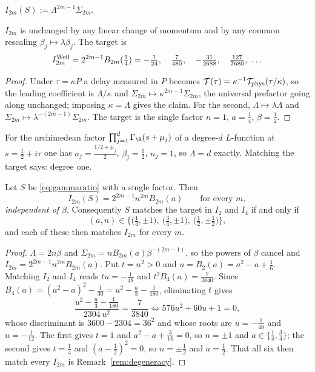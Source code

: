 \begin{definition}\label{def:invariants}
$I_{2m}(S):=\Lambda^{2m-1}\Sigma_{2m}$.
\end{definition}

\begin{proposition}\label{prop:dictfree}
$I_{2m}$ is unchanged by any linear change of momentum and by any common
rescaling $\beta_j\mapsto\lambda\beta_j$. The target is
\[
 I_{2m}^{\rm Weil}=2^{2m-1}B_{2m}(\tfrac14)
 =-\tfrac1{24},\quad\tfrac7{480},\quad-\tfrac{31}{2688},\quad\tfrac{127}{7680},\ \dots
\]
\end{proposition}

\begin{proof}
Under $\tau=\kappa P$ a delay measured in $P$ becomes
$\mathcal T(\tau)=\kappa^{-1}\mathcal T_{\rm phys}(\tau/\kappa)$, so the leading
coefficient is $\Lambda/\kappa$ and $\Sigma_{2m}\mapsto\kappa^{2m-1}\Sigma_{2m}$,
the universal prefactor going along unchanged; imposing $\kappa=\Lambda$ gives the
claim. For the
second, $\Lambda\mapsto\lambda\Lambda$ and
$\Sigma_{2m}\mapsto\lambda^{-(2m-1)}\Sigma_{2m}$. The target is the single factor
$n=1$, $a=\frac14$, $\beta=\frac12$.
\end{proof}

\begin{corollary}\label{cor:degree}
For the archimedean factor $\prod_{j=1}^d\Gamma_\R(s+\mu_j)$ of a degree-$d$
$L$-function at $s=\frac12+i\tau$ one has $a_j=\frac{1/2+\mu_j}2$,
$\beta_j=\frac12$, $n_j=1$, so $\Lambda=d$ exactly. Matching the target says:
degree one.
\end{corollary}

\begin{theorem}\label{thm:onefactor}
Let $S$ be \eqref{eq:gammaratio} with a single factor. Then
\[
 I_{2m}(S)=2^{2m-1}n^{2m}B_{2m}(a)\qquad\text{for every }m,
\]
\emph{independent of $\beta$}. Consequently $S$ matches the target in $I_2$ and
$I_4$ if and only if
\[
 (a,n)\in\Big\{\big(\tfrac14,\pm1\big),\ \big(\tfrac34,\pm1\big),\
 \big(\tfrac12,\pm\tfrac12\big)\Big\},
\]
and each of these then matches $I_{2m}$ for every $m$.
\end{theorem}

\begin{proof}
$\Lambda=2n\beta$ and $\Sigma_{2m}=nB_{2m}(a)\beta^{-(2m-1)}$, so the powers of
$\beta$ cancel and $I_{2m}=2^{2m-1}n^{2m}B_{2m}(a)$. Put $t=n^2>0$ and
$u=B_2(a)=a^2-a+\frac16$. Matching $I_2$ and $I_4$ reads $tu=-\frac1{48}$ and
$t^2B_4(a)=\frac7{3840}$. Since $B_4(a)=(a^2-a)^2-\frac1{30}=u^2-\frac u3-\frac1{180}$,
eliminating $t$ gives
\[
 \frac{u^2-\frac u3-\frac1{180}}{2304\,u^2}=\frac7{3840}
 \iff 576u^2+60u+1=0,
\]
whose discriminant is $3600-2304=36^2$ and whose roots are $u=-\frac1{48}$ and
$u=-\frac1{12}$. The first gives $t=1$ and $a^2-a+\frac3{16}=0$, so $n=\pm1$ and
$a\in\{\frac14,\frac34\}$; the second gives $t=\frac14$ and $(a-\frac12)^2=0$, so
$n=\pm\frac12$ and $a=\frac12$. That all six then match every $I_{2m}$ is
Remark~\ref{rem:degeneracy}.
\end{proof}

